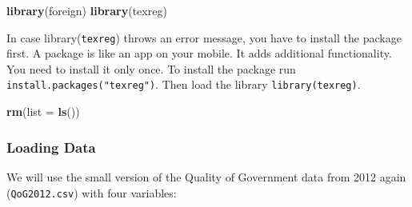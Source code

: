 \documentclass[]{article}
\newenvironment{Shaded}{\begin{snugshade}}{\end{snugshade}}
\newcommand{\KeywordTok}[1]{\textcolor[rgb]{0.13,0.29,0.53}{\textbf{#1}}}
\newcommand{\DataTypeTok}[1]{\textcolor[rgb]{0.13,0.29,0.53}{#1}}
\newcommand{\NormalTok}[1]{#1}
\theoremstyle{definition}
\theoremstyle{definition}
\theoremstyle{definition}
\theoremstyle{remark}
\begin{document}
\begin{Shaded}
\begin{Highlighting}[]
\KeywordTok{library}\NormalTok{(foreign) }
\KeywordTok{library}\NormalTok{(texreg)}
\end{Highlighting}
\end{Shaded}

In case library(\texttt{texreg}) throws an error message, you have to
install the package first. A package is like an app on your mobile. It
adds additional functionality. You need to install it only once. To
install the package run \texttt{install.packages("texreg")}. Then load
the library \texttt{library(texreg)}.

\begin{Shaded}
\begin{Highlighting}[]
\KeywordTok{rm}\NormalTok{(}\DataTypeTok{list =} \KeywordTok{ls}\NormalTok{())}
\end{Highlighting}
\end{Shaded}

\subsubsection{Loading Data}\label{loading-data-1}

We will use the small version of the Quality of Government data from
2012 again (\texttt{QoG2012.csv}) with four variables:
\end{document}

